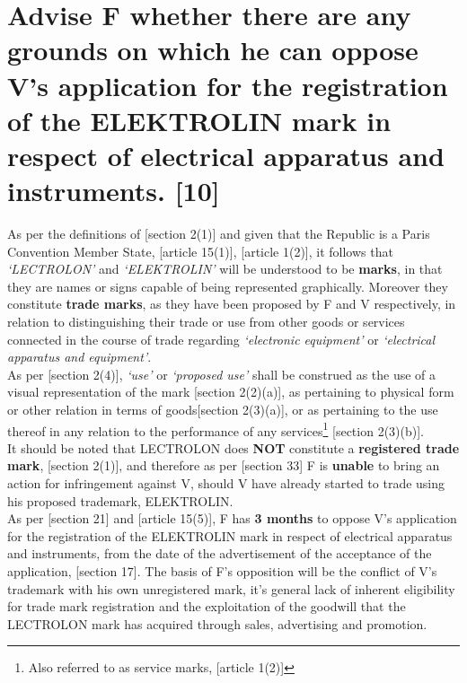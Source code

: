 \documentclass[11pt]{article}
\begin{document}
\section{Advise F whether there are any grounds on which he can oppose V's application for the registration of the ELEKTROLIN mark in respect of electrical apparatus and instruments. [10]}
\label{sec:org7adb15a}
As per the definitions of [section 2(1)]\cite{rsa93_tm_act} and given that the Republic is a Paris Convention Member State, [article 15(1)]\cite{wto17_trips}, [article 1(2)]\cite{wipo83_paris_conve_protect_ip}, it follows that \emph{`LECTROLON'} and \emph{`ELEKTROLIN'} will be understood to be \textbf{marks}, in that they are names or signs capable of being represented graphically. Moreover they constitute \textbf{trade marks}, as they have been proposed by F and V respectively, in relation to distinguishing their trade or use from other goods or services connected in the course of trade regarding \emph{`electronic equipment'} or \emph{`electrical apparatus and equipment'}.\\

As per [section 2(4)]\cite{rsa93_tm_act}, \emph{`use'} or \emph{`proposed use'} shall be construed as the use of a visual representation of the mark [section 2(2)(a)]\cite{rsa93_tm_act}, as pertaining to physical form or other relation in terms of goods[section 2(3)(a)]\cite{rsa93_tm_act}, or as pertaining to the use thereof in any relation to the performance of any services\footnote{Also referred to as service marks, [article 1(2)]\cite{wipo83_paris_conve_protect_ip}} [section 2(3)(b)]\cite{rsa93_tm_act}.\\

It should be noted that LECTROLON does \textbf{NOT} constitute a \textbf{registered trade mark}, [section 2(1)]\cite{rsa93_tm_act}, and therefore as per [section 33]\cite{rsa93_tm_act} F is \textbf{unable} to bring an action for infringement against V, should V have already started to trade using his proposed trademark, ELEKTROLIN.\\

As per [section 21]\cite{rsa93_tm_act} and [article 15(5)]\cite{wto17_trips}, F has \textbf{3 months} to oppose V's application for the registration of the ELEKTROLIN mark in respect of electrical apparatus and instruments, from the date of the advertisement of the acceptance of the application, [section 17]\cite{rsa93_tm_act}. The basis of F's opposition will be the conflict of V's trademark with his own unregistered mark, it's general lack of inherent eligibility for trade mark registration and the exploitation of the goodwill that the LECTROLON mark has acquired through sales, advertising and promotion.\\
\end{document}
